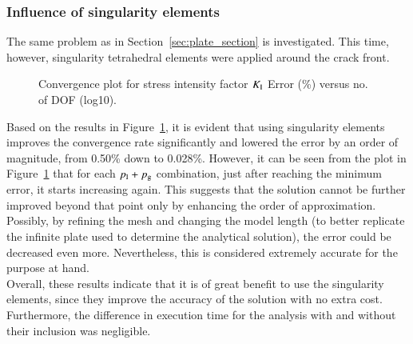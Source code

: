 \documentclass[review]{elsarticle}
\numberwithin{equation}{section}
\begin{document}
\subsubsection{Influence of singularity elements}
\label{sec:quarter_point_results}
The same problem as in Section~\ref{sec:plate_section} is investigated. This time, however, singularity tetrahedral elements were applied around the crack front.
\begin{figure}[h!]
	\centering
	
	
	\caption{Convergence plot for stress intensity factor $K_{\rm I}$ Error (\%) versus no. of DOF (log10).}
	\label{fig:plate_conv_singularity}
\end{figure}
Based on the results in Figure~\ref{fig:plate_conv_singularity}, it is evident that using singularity elements improves the convergence rate significantly and lowered the error by an order of magnitude, from 0.50\% down to 0.028\%. 
However, it can be seen from the plot in Figure~\ref{fig:plate_conv_singularity} that for each $p_{\rm l} + p_{\rm g}$ combination, just after reaching the minimum error, it starts increasing again. 
This suggests that the solution cannot be further improved beyond that point only by enhancing the order of approximation. 
Possibly, by refining the mesh and changing the model length (to better replicate the infinite plate used to determine the analytical solution), the error could be decreased even more. 
Nevertheless, this is considered extremely accurate for the purpose at hand. \\
Overall, these results indicate that it is of great benefit to use the singularity elements, since they improve the accuracy of the solution with no extra cost.
Furthermore, the difference in execution time for the analysis with and without their inclusion was negligible. 
\end{document}
